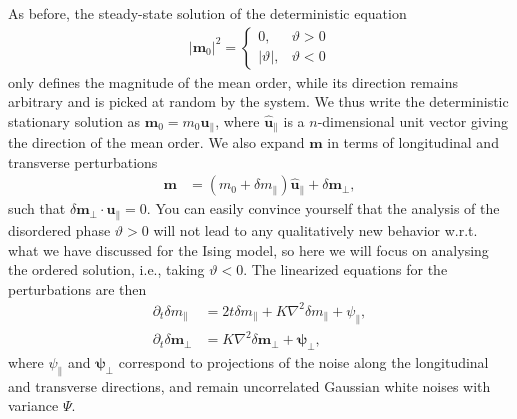 As before, the steady-state solution of the deterministic equation
%
\begin{align*}
    |\bm m_0|^2 
    =
    \begin{cases}
        0, & \vartheta > 0 \\
        |\vartheta|, & \vartheta < 0 
    \end{cases}
\end{align*}
%
only defines the magnitude of the mean order, while its direction remains arbitrary and is picked at random by the system.
We thus write the deterministic stationary solution as $\bm m_0 = m_0 \hat {\bm u}_\parallel$, where $\hat {\bm u}_\parallel$ is a $n$-dimensional unit vector giving the direction of the 
mean order.
We also expand $\bm m$ in terms of longitudinal and transverse perturbations
%
\begin{align*}
    \bm m &= (m_0 + \delta m_\parallel) \hat {\bm u}_\parallel + \delta \bm m_\perp,
\end{align*}
%
such that $\delta \bm m_\perp \cdot \hat {\bm u}_\parallel = 0$.
You can easily convince yourself that the analysis of the disordered phase $\vartheta > 0$ will not lead to any qualitatively new behavior w.r.t. what we have discussed for the Ising model, so here we will focus on analysing the ordered solution, i.e., taking $\vartheta < 0$.
The linearized equations for the perturbations are then
%
\begin{subequations}
\begin{align}
    \label{eq_ON_dmpara}
    \partial_t \delta m_\parallel 
    & = 
    2 t \delta m_\parallel + K \nabla^2 \delta m_\parallel + \psi_\parallel, \\
    \label{eq_ON_dmperp}
    \partial_t \delta \bm m_\perp
    & = K \nabla^2 \delta \bm m_\perp + \bm \psi_\perp,
\end{align}
\end{subequations}
%
where $\psi_\|$ and $\bm \psi_\perp$ correspond to projections of the noise along the longitudinal and transverse directions, and remain uncorrelated Gaussian white noises with variance $\Psi$.

